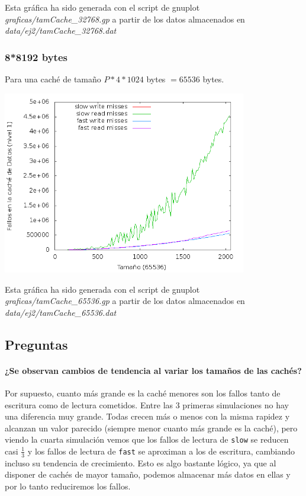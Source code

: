 \documentclass[nochap]{apuntes}
\begin{document}
Esta gráfica ha sido generada con el script de gnuplot \emph{graficas/tamCache\_32768.gp} a partir de los datos almacenados en \emph{data/ej2/tamCache\_32768.dat}

\subsubsection*{8*8192 bytes}
Para una caché de tamaño $P*4*1024$ bytes $= 65536 $ bytes.

\begin{center}
\includegraphics[width=0.8\textwidth]{graficas/fotos/Cache_65536.png}
\end{center}

Esta gráfica ha sido generada con el script de gnuplot \emph{graficas/tamCache\_65536.gp} a partir de los datos almacenados en \emph{data/ej2/tamCache\_65536.dat}


\subsection*{Preguntas}

 \paragraph{¿Se observan cambios de tendencia al variar los tamaños de las cachés?}

Por supuesto, cuanto más grande es la caché menores son los fallos tanto de escritura como de lectura cometidos. Entre las 3 primeras simulaciones no hay una diferencia muy grande. Todas crecen más o menos con la misma rapidez y alcanzan un valor parecido (siempre menor cuanto más grande es la caché), pero viendo la cuarta simulación vemos que los fallos de lectura de \texttt{slow} se reducen casi $\frac{1}{3}$ y los fallos de lectura de \texttt{fast} se aproximan a los de escritura, cambiando incluso su tendencia de crecimiento. Esto es algo bastante lógico, ya que al disponer de cachés de mayor tamaño, podemos almacenar más datos en ellas y por lo tanto reduciremos los fallos.
\end{document}
